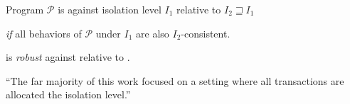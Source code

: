 
\begin{frame}{}
	\begin{center}
		Program $\mathcal{P}$ is 
		against isolation level $I_{1}$ relative to $I_{2} \sqsupseteq I_{1}$


		{\it if } all behaviors of $\mathcal{P}$ under $I_{1}$
		are also $I_{2}$-consistent.
	\end{center}
\end{frame}

\begin{frame}{}
	\begin{center}
		 is \emph{robust} against \si{} relative to \ser.

	\end{center}
\end{frame}

\begin{frame}{}
	

	\pause
	\vspace{0.30cm}
	``The far majority of this work focused on
	  a  setting
		where all transactions are allocated
		the  isolation level.''
\end{frame}



